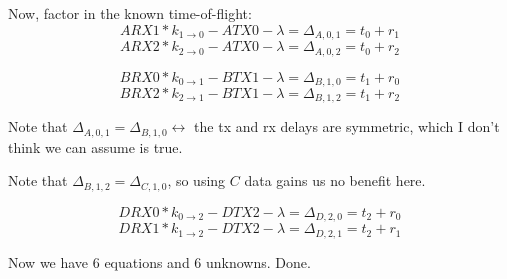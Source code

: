 \documentclass{article}
\begin{document}
Now, factor in the known time-of-flight:
\[ ARX1 * k_{1\rightarrow0} - ATX0 - \lambda = \Delta_{A,0,1} = t_0 + r_1 \]
\[ ARX2 * k_{2\rightarrow0} - ATX0 - \lambda = \Delta_{A,0,2} = t_0 + r_2 \]

\[ BRX0 * k_{0\rightarrow1} - BTX1 - \lambda = \Delta_{B,1,0} = t_1 + r_0 \]
\[ BRX2 * k_{2\rightarrow1} - BTX1 - \lambda = \Delta_{B,1,2} = t_1 + r_2 \]

Note that $\Delta_{A,0,1} = \Delta_{B,1,0} \leftrightarrow$ the tx and rx delays
are symmetric, which I don't think we can assume is true.

Note that $\Delta_{B,1,2} = \Delta_{C,1,0}$, so using $C$ data
gains us no benefit here.

\[ DRX0 * k_{0\rightarrow2} - DTX2 - \lambda = \Delta_{D,2,0} = t_2 + r_0 \]
\[ DRX1 * k_{1\rightarrow2} - DTX2 - \lambda = \Delta_{D,2,1} = t_2 + r_1 \]

Now we have 6 equations and 6 unknowns. Done.
\end{document}
